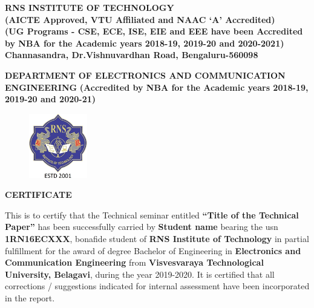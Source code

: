 %
\setlength{\toptafiddle}{1in}
\setlength{\bottafiddle}{1in}
\vspace*{-0.4in}
\enlargethispage{\bottafiddle}
\thispagestyle{empty}


\begin{center}
	\large\textbf{RNS INSTITUTE OF TECHNOLOGY}\\
	\small\textbf{(AICTE Approved, VTU Affiliated and NAAC `A' Accredited)\\
		(UG Programs - CSE, ECE, ISE, EIE and EEE have been Accredited by NBA for the Academic years 2018-19, 2019-20 and 2020-2021)\\
		Channasandra, Dr.Vishnuvardhan Road, Bengaluru-560098}\\
\end{center}
\begin{center}
	\footnotesize\textbf{DEPARTMENT OF ELECTRONICS AND COMMUNICATION ENGINEERING}
	\small\textbf{(Accredited by NBA for the Academic years 2018-19, 2019-20 and 2020-21)}	
\end{center}

\begin{center}
\begin{figure}[h]
\centering
\includegraphics[height=2.8cm]{images/rns1.jpg}
\end{figure}
\Large{\textbf{CERTIFICATE}}
\end{center}

This is to certify that the Technical seminar entitled \textbf{\color{red}``Title of the Technical Paper''} has been successfully carried by \textbf{Student name} bearing the usn \textbf{1RN16ECXXX}, bonafide student of \textbf{\color{blue}RNS Institute of Technology} in partial fulfillment for the award of degree Bachelor of Engineering in \textbf{\color{blue}Electronics and Communication Engineering} from \textbf{\color{blue}Visvesvaraya Technological University, Belagavi}, during the year 2019-2020. It is certified that all corrections / suggestions indicated for internal assessment have been incorporated in the report.

